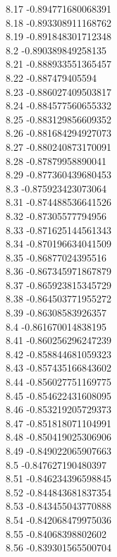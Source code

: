 {8.17	-0.894771680068391\\
8.18	-0.893308911168762\\
8.19	-0.891848301712348\\
8.2	-0.890389849258135\\
8.21	-0.888933551365457\\
8.22	-0.887479405594\\
8.23	-0.886027409503817\\
8.24	-0.884577560655332\\
8.25	-0.883129856609352\\
8.26	-0.881684294927073\\
8.27	-0.880240873170091\\
8.28	-0.87879958890041\\
8.29	-0.877360439680453\\
8.3	-0.875923423073064\\
8.31	-0.874488536641526\\
8.32	-0.87305577794956\\
8.33	-0.871625144561343\\
8.34	-0.870196634041509\\
8.35	-0.86877024395516\\
8.36	-0.867345971867879\\
8.37	-0.865923815345729\\
8.38	-0.864503771955272\\
8.39	-0.86308583926357\\
8.4	-0.861670014838195\\
8.41	-0.860256296247239\\
8.42	-0.858844681059323\\
8.43	-0.857435166843602\\
8.44	-0.856027751169775\\
8.45	-0.854622431608095\\
8.46	-0.853219205729373\\
8.47	-0.851818071104991\\
8.48	-0.850419025306906\\
8.49	-0.849022065907663\\
8.5	-0.847627190480397\\
8.51	-0.846234396598845\\
8.52	-0.844843681837354\\
8.53	-0.843455043770888\\
8.54	-0.842068479975036\\
8.55	-0.84068398802602\\
8.56	-0.839301565500704\\
}
